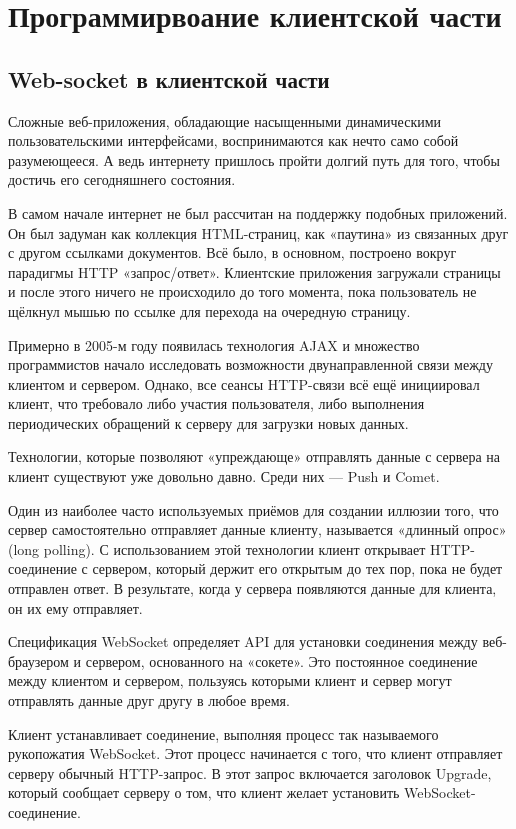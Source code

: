 \chapter{Программирвоание клиентской части}
\section{Web-socket в клиентской части}

Сложные веб-приложения, обладающие насыщенными динамическими пользовательскими интерфейсами, воспринимаются как нечто само собой разумеющееся. А ведь интернету пришлось пройти долгий путь для того, чтобы достичь его сегодняшнего состояния.

В самом начале интернет не был рассчитан на поддержку подобных приложений. Он был задуман как коллекция HTML-страниц, как «паутина» из связанных друг с другом ссылками документов. Всё было, в основном, построено вокруг парадигмы HTTP «запрос/ответ». Клиентские приложения загружали страницы и после этого ничего не происходило до того момента, пока пользователь не щёлкнул мышью по ссылке для перехода на очередную страницу.

Примерно в 2005-м году появилась технология AJAX \cite{garrett2005ajax} и множество программистов начало исследовать возможности двунаправленной связи между клиентом и сервером. Однако, все сеансы HTTP-связи всё ещё инициировал клиент, что требовало либо участия пользователя, либо выполнения периодических обращений к серверу для загрузки новых данных.

Технологии, которые позволяют «упреждающе» отправлять данные с сервера на клиент существуют уже довольно давно. Среди них — Push и Comet.

Один из наиболее часто используемых приёмов для создании иллюзии того, что сервер самостоятельно отправляет данные клиенту, называется «длинный опрос» (long polling). С использованием этой технологии клиент открывает HTTP-соединение с сервером, который держит его открытым до тех пор, пока не будет отправлен ответ. В результате, когда у сервера появляются данные для клиента, он их ему отправляет.

Спецификация WebSocket определяет API для установки соединения между веб-браузером и сервером, основанного на «сокете». Это постоянное соединение между клиентом и сервером, пользуясь которыми клиент и сервер могут отправлять данные друг другу в любое время.

Клиент устанавливает соединение, выполняя процесс так называемого рукопожатия WebSocket. Этот процесс начинается с того, что клиент отправляет серверу обычный HTTP-запрос. В этот запрос включается заголовок Upgrade, который сообщает серверу о том, что клиент желает установить WebSocket-соединение.

